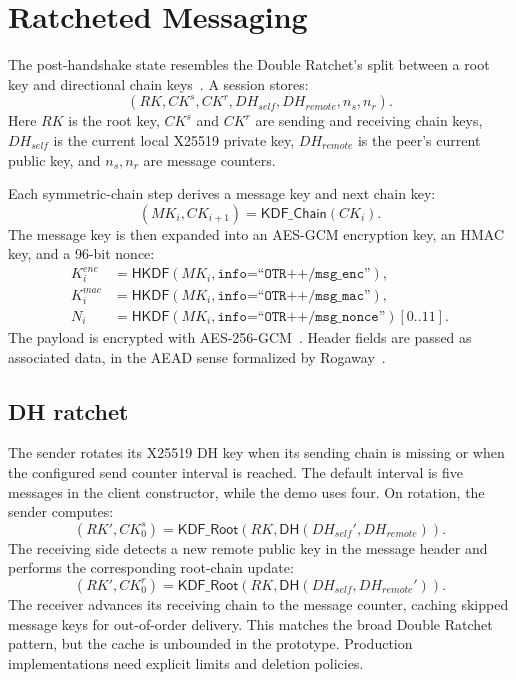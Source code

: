 \documentclass[11pt]{article}
\newcommand{\HKDF}{\mathsf{HKDF}}
\newcommand{\DH}{\mathsf{DH}}
\begin{document}
\section{Ratcheted Messaging}
\label{sec:ratchet}

The post-handshake state resembles the Double Ratchet's split between a root key and directional chain keys~\cite{signal_doubleratchet}. A session stores:
\[
  (RK, CK^s, CK^r, DH_{self}, DH_{remote}, n_s, n_r).
\]
Here $RK$ is the root key, $CK^s$ and $CK^r$ are sending and receiving chain keys, $DH_{self}$ is the current local X25519 private key, $DH_{remote}$ is the peer's current public key, and $n_s,n_r$ are message counters.

Each symmetric-chain step derives a message key and next chain key:
\[
  (MK_i, CK_{i+1}) = \mathsf{KDF\_Chain}(CK_i).
\]
The message key is then expanded into an AES-GCM encryption key, an HMAC key, and a 96-bit nonce:
\begin{align*}
  K^{enc}_i &= \HKDF(MK_i, \texttt{info=``OTR++/msg\_enc''}),\\
  K^{mac}_i &= \HKDF(MK_i, \texttt{info=``OTR++/msg\_mac''}),\\
  N_i &= \HKDF(MK_i, \texttt{info=``OTR++/msg\_nonce''})[0..11].
\end{align*}
The payload is encrypted with AES-256-GCM~\cite{nist_fips197,nist_sp800_38d}. Header fields are passed as associated data, in the AEAD sense formalized by Rogaway~\cite{rogaway2002aead}.

\subsection{DH ratchet}

The sender rotates its X25519 DH key when its sending chain is missing or when the configured send counter interval is reached. The default interval is five messages in the client constructor, while the demo uses four. On rotation, the sender computes:
\[
  (RK', CK^s_0) = \mathsf{KDF\_Root}(RK, \DH(DH_{self}', DH_{remote})).
\]
The receiving side detects a new remote public key in the message header and performs the corresponding root-chain update:
\[
  (RK', CK^r_0) = \mathsf{KDF\_Root}(RK, \DH(DH_{self}, DH_{remote}')).
\]
The receiver advances its receiving chain to the message counter, caching skipped message keys for out-of-order delivery. This matches the broad Double Ratchet pattern, but the cache is unbounded in the prototype. Production implementations need explicit limits and deletion policies.
\end{document}
